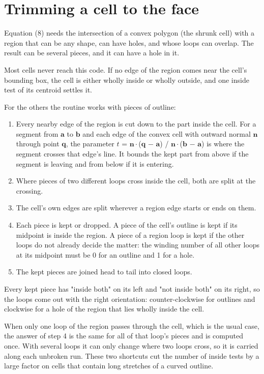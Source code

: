 \documentclass[11pt,a4paper]{article}
\begin{document}
\section{Trimming a cell to the face}
 

Equation (8) needs the intersection of a convex polygon (the shrunk cell) with a region that can be any shape, can have holes, and whose loops can overlap. The result can be several pieces, and it can have a hole in it. 

Most cells never reach this code. If no edge of the region comes near the cell's bounding box, the cell is either wholly inside or wholly outside, and one inside test of its centroid settles it. 

For the others the routine works with pieces of outline: 
\begin{enumerate}
 
\item Every nearby edge of the region is cut down to the part inside the cell. For a segment from $\mathbf{a}$ to $\mathbf{b}$ and each edge of the convex cell with outward normal $\mathbf{n}$ through point $\mathbf{q}$, the parameter $t$ = $\mathbf{n}\cdot $($\mathbf{q}$ $-$ $\mathbf{a}$) / $\mathbf{n}\cdot $($\mathbf{b}$ $-$ $\mathbf{a}$) is where the segment crosses that edge's line. It bounds the kept part from above if the segment is leaving and from below if it is entering. 
\item Where pieces of two different loops cross inside the cell, both are split at the crossing. 
\item The cell's own edges are split wherever a region edge starts or ends on them. 
\item Each piece is kept or dropped. A piece of the cell's outline is kept if its midpoint is inside the region. A piece of a region loop is kept if the other loops do not already decide the matter: the winding number of all other loops at its midpoint must be 0 for an outline and 1 for a hole. 
\item The kept pieces are joined head to tail into closed loops. 
\end{enumerate}
 

Every kept piece has "inside both" on its left and "not inside both" on its right, so the loops come out with the right orientation: counter-clockwise for outlines and clockwise for a hole of the region that lies wholly inside the cell. 

When only one loop of the region passes through the cell, which is the usual case, the answer of step 4 is the same for all of that loop's pieces and is computed once. With several loops it can only change where two loops cross, so it is carried along each unbroken run. These two shortcuts cut the number of inside tests by a large factor on cells that contain long stretches of a curved outline. 
\end{document}
